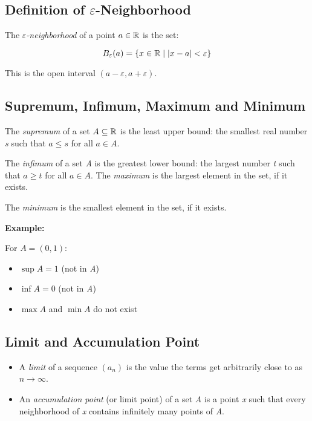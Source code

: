 \subsection{Definition of \texorpdfstring{\(\varepsilon\)}{ε}-Neighborhood}

The \emph{\(\varepsilon\)-neighborhood} of a point \(a \in \mathbb{R}\) is the set:

\[
    B_\varepsilon(a) = \{x \in \mathbb{R} \mid |x - a| < \varepsilon\}
\]

This is the open interval \((a - \varepsilon, a + \varepsilon)\).

\subsection{Supremum, Infimum, Maximum and Minimum}

The \emph{supremum} of a set \(A \subseteq \mathbb{R}\) is the 
least upper bound: the smallest real number \emph{s} such that \(a \le s\) for all \(a \in A\).

The \emph{infimum} of a set \emph{A} is the greatest lower bound: 
the largest number \emph{t} such that \(a \ge t\) for all \(a \in A\). The \emph{maximum} is the largest 
element in the set, if it exists.

The \emph{minimum} is the smallest element in the set, if it exists.
\vspace{\baselineskip}

\textbf{Example:}
\vspace{\baselineskip}

For \(A = (0,1)\):

\begin{itemize}

    \item \(\sup A = 1\) (not in \emph{A})

    \item \(\inf A = 0\) (not in \emph{A})

    \item \(\max A\) and \(\min A\) do not exist

\end{itemize}

\subsection{Limit and Accumulation Point}

\begin{itemize}

    \item A \emph{limit} of a sequence \((a_n)\) is the value the terms get arbitrarily close to as 
    \(n \to \infty\).

    \item An \emph{accumulation point} (or limit point) of a set \emph{A} is a point \emph{x} such that every 
    neighborhood of \emph{x} contains infinitely many points of \emph{A}.

\end{itemize}


